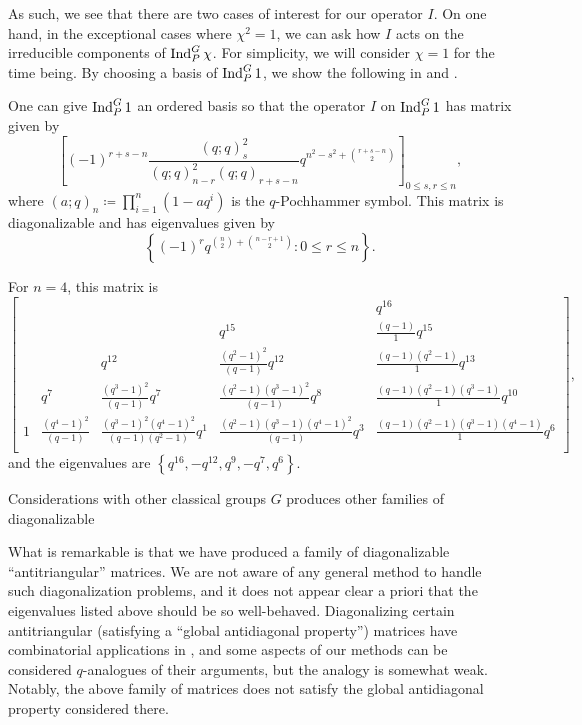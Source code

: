 \documentclass{amsart}
\begin{document}
As such, we see that there are two cases of interest for our operator $I$. On one hand, in the exceptional cases where $\chi^2=1$, we can ask how $I$ acts on the irreducible components of $\operatorname{Ind}_P^G\chi$. For simplicity, we will consider $\chi=1$ for the time being. By choosing a basis of $\operatorname{Ind}_P^G1$, we show the following in  and .
\begin{theorem}
    One can give $\operatorname{Ind}_P^G1$ an ordered basis so that the operator $I$ on $\operatorname{Ind}_P^G1$ has matrix given by
    \[\left[(-1)^{r+s-n}\frac{(q;q)_s^2}{(q;q)_{n-r}^2(q;q)_{r+s-n}}q^{n^2-s^2+\binom{r+s-n}2}\right]_{0\le s,r\le n},\]
    where $(a;q)_n\coloneqq\prod_{i=1}^n\left(1-aq^i\right)$ is the $q$-Pochhammer symbol. This matrix is diagonalizable and has eigenvalues given by
    \[\left\{(-1)^{r}q^{\binom n2+\binom{n-r+1}2}:0\le r\le n\right\}.\]
\end{theorem}
\begin{example}
    For $n=4$, this matrix is
    \[\begin{bmatrix}  &   &   &   & q^{16}\\  &   &   & q^{15}  & \frac{ ( q - 1 ) }{1} q^{15}\\  &   & q^{12}  & \frac{ ( q^{2} - 1 ) ^{2} }{ ( q - 1 ) } q^{12}  & \frac{ ( q - 1 ) ( q^{2} - 1 ) }{1} q^{13}\\  & q^{7}  & \frac{ ( q^{3} - 1 ) ^{2} }{ ( q - 1 ) } q^{7}  & \frac{ ( q^{2} - 1 ) ( q^{3} - 1 ) ^{2} }{ ( q - 1 ) } q^{8}  & \frac{ ( q - 1 ) ( q^{2} - 1 ) ( q^{3} - 1 ) }{1} q^{10}\\1 & \frac{ ( q^{4} - 1 ) ^{2} }{ ( q - 1 ) }  & \frac{ ( q^{3} - 1 ) ^{2} ( q^{4} - 1 ) ^{2} }{ ( q - 1 ) ( q^{2} - 1 ) } q^{1}  & \frac{ ( q^{2} - 1 ) ( q^{3} - 1 ) ( q^{4} - 1 ) ^{2} }{ ( q - 1 ) } q^{3}  & \frac{ ( q - 1 ) ( q^{2} - 1 ) ( q^{3} - 1 ) ( q^{4} - 1 ) }{1} q^{6}\\\end{bmatrix},\]
    and the eigenvalues are $\left\{q^{16},-q^{12},q^9,-q^7,q^6\right\}$.
\end{example}
\begin{remark}
    Considerations with other classical groups $G$ produces other families of diagonalizable 
\end{remark}
What is remarkable is that we have produced a family of diagonalizable ``antitriangular'' matrices. We are not aware of any general method to handle such diagonalization problems, and it does not appear clear a priori that the eigenvalues listed above should be so well-behaved. Diagonalizing certain antitriangular (satisfying a ``global antidiagonal property'') matrices have combinatorial applications in \cite{britnell-antitriangular}, and some aspects of our methods can be considered $q$-analogues of their arguments, but the analogy is somewhat weak. Notably, the above family of matrices does not satisfy the global antidiagonal property considered there.
\end{document}
